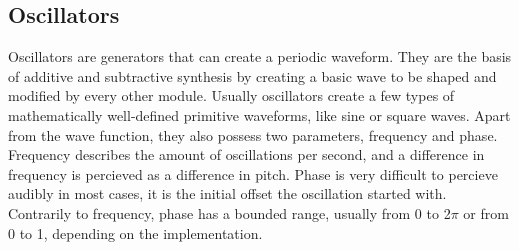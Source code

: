 \documentclass[11pt,a4paper]{article}
\begin{document}
\subsection{Oscillators}

Oscillators are generators that can create a periodic waveform. They are the basis of additive and subtractive synthesis by creating a basic wave to be shaped and modified by every other module. Usually oscillators create a few types of mathematically well-defined primitive waveforms, like sine or square waves. Apart from the wave function, they also possess two parameters, frequency and phase. Frequency describes the amount of oscillations per second, and a difference in frequency is percieved as a difference in pitch. Phase is very difficult to percieve audibly in most cases, it is the initial offset the oscillation started with. Contrarily to frequency, phase has a bounded range, usually from 0 to 2$\pi$ or from 0 to 1, depending on the implementation.
\end{document}

